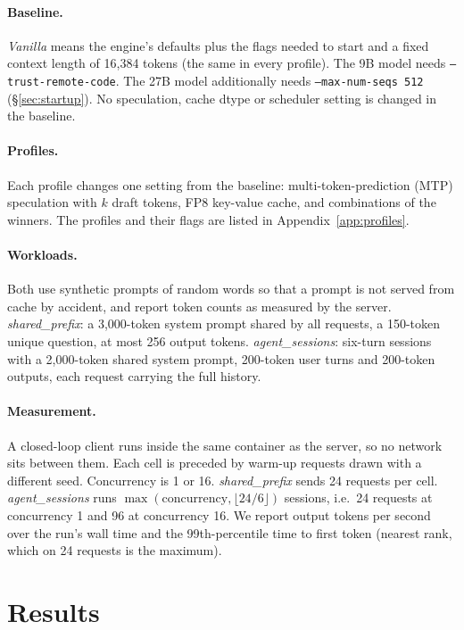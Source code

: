 \documentclass[11pt]{article}
\begin{document}
\paragraph{Baseline.} \emph{Vanilla} means the engine's defaults plus the flags needed to start and a fixed context length of 16{,}384 tokens
(the same in every profile). The 9B model needs \texttt{--trust-remote-code}. The 27B model additionally needs \texttt{--max-num-seqs 512}
(\S\ref{sec:startup}). No speculation, cache dtype or scheduler setting is changed in the baseline.

\paragraph{Profiles.} Each profile changes one setting from the baseline: multi-token-prediction (MTP) speculation with $k$ draft tokens,
FP8 key-value cache, and combinations of the winners. The profiles and their flags are listed in Appendix~\ref{app:profiles}.

\paragraph{Workloads.} Both use synthetic prompts of random words so that a prompt is not served from cache by accident, and report token counts as measured by the server.
\emph{shared\_prefix}: a 3{,}000-token system prompt shared by all requests, a 150-token unique question, at most 256 output tokens.
\emph{agent\_sessions}: six-turn sessions with a 2{,}000-token shared system prompt, 200-token user turns and 200-token outputs, each request carrying the full history.

\paragraph{Measurement.} A closed-loop client runs inside the same container as the server, so no network sits between them. Each cell is preceded by warm-up
requests drawn with a different seed. Concurrency is 1 or 16. \emph{shared\_prefix} sends 24 requests per cell.
\emph{agent\_sessions} runs $\max(\text{concurrency},\lfloor 24/6\rfloor)$ sessions, i.e.\ 24 requests at concurrency 1 and 96 at concurrency 16.
We report output tokens per second over the run's wall time and the 99th-percentile time to first token (nearest rank, which on 24 requests is the maximum).

\section{Results}\label{sec:results}
\end{document}
